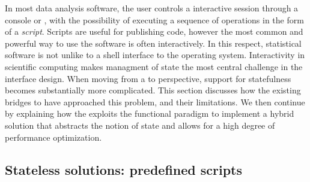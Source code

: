 
In most data analysis software, the user controls a interactive session through a console or \GUI, with the possibility of executing a sequence of operations in the form of a \emph{script}. Scripts are useful for publishing code, however the most common and powerful way to use the software is often interactively. In this respect, statistical software is not unlike to a shell interface to the operating system. Interactivity in scientific computing makes managment of state the most central challenge in the interface design. When moving from a \UI to \API perspective, support for statefulness becomes substantially more complicated. This section discusses how the existing bridges to \R have approached this problem, and their limitations. We then continue by explaining how the \OpenCPU \API exploits the functional paradigm to implement a hybrid solution that abstracts the notion of state and allows for a high degree of performance optimization.

\subsection{Stateless solutions: predefined scripts}

